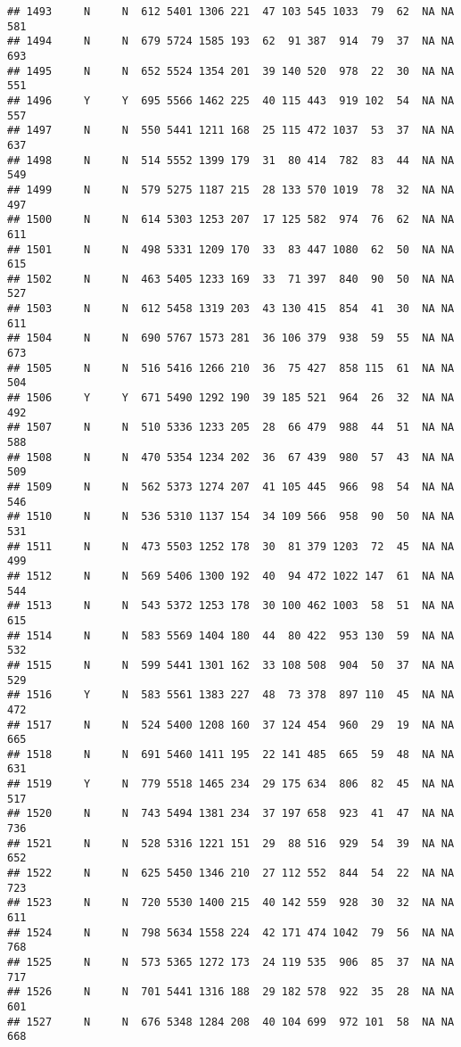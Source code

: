 \documentclass[]{article}
\begin{document}
\begin{verbatim}
## 1493     N     N  612 5401 1306 221  47 103 545 1033  79  62  NA NA  581
## 1494     N     N  679 5724 1585 193  62  91 387  914  79  37  NA NA  693
## 1495     N     N  652 5524 1354 201  39 140 520  978  22  30  NA NA  551
## 1496     Y     Y  695 5566 1462 225  40 115 443  919 102  54  NA NA  557
## 1497     N     N  550 5441 1211 168  25 115 472 1037  53  37  NA NA  637
## 1498     N     N  514 5552 1399 179  31  80 414  782  83  44  NA NA  549
## 1499     N     N  579 5275 1187 215  28 133 570 1019  78  32  NA NA  497
## 1500     N     N  614 5303 1253 207  17 125 582  974  76  62  NA NA  611
## 1501     N     N  498 5331 1209 170  33  83 447 1080  62  50  NA NA  615
## 1502     N     N  463 5405 1233 169  33  71 397  840  90  50  NA NA  527
## 1503     N     N  612 5458 1319 203  43 130 415  854  41  30  NA NA  611
## 1504     N     N  690 5767 1573 281  36 106 379  938  59  55  NA NA  673
## 1505     N     N  516 5416 1266 210  36  75 427  858 115  61  NA NA  504
## 1506     Y     Y  671 5490 1292 190  39 185 521  964  26  32  NA NA  492
## 1507     N     N  510 5336 1233 205  28  66 479  988  44  51  NA NA  588
## 1508     N     N  470 5354 1234 202  36  67 439  980  57  43  NA NA  509
## 1509     N     N  562 5373 1274 207  41 105 445  966  98  54  NA NA  546
## 1510     N     N  536 5310 1137 154  34 109 566  958  90  50  NA NA  531
## 1511     N     N  473 5503 1252 178  30  81 379 1203  72  45  NA NA  499
## 1512     N     N  569 5406 1300 192  40  94 472 1022 147  61  NA NA  544
## 1513     N     N  543 5372 1253 178  30 100 462 1003  58  51  NA NA  615
## 1514     N     N  583 5569 1404 180  44  80 422  953 130  59  NA NA  532
## 1515     N     N  599 5441 1301 162  33 108 508  904  50  37  NA NA  529
## 1516     Y     N  583 5561 1383 227  48  73 378  897 110  45  NA NA  472
## 1517     N     N  524 5400 1208 160  37 124 454  960  29  19  NA NA  665
## 1518     N     N  691 5460 1411 195  22 141 485  665  59  48  NA NA  631
## 1519     Y     N  779 5518 1465 234  29 175 634  806  82  45  NA NA  517
## 1520     N     N  743 5494 1381 234  37 197 658  923  41  47  NA NA  736
## 1521     N     N  528 5316 1221 151  29  88 516  929  54  39  NA NA  652
## 1522     N     N  625 5450 1346 210  27 112 552  844  54  22  NA NA  723
## 1523     N     N  720 5530 1400 215  40 142 559  928  30  32  NA NA  611
## 1524     N     N  798 5634 1558 224  42 171 474 1042  79  56  NA NA  768
## 1525     N     N  573 5365 1272 173  24 119 535  906  85  37  NA NA  717
## 1526     N     N  701 5441 1316 188  29 182 578  922  35  28  NA NA  601
## 1527     N     N  676 5348 1284 208  40 104 699  972 101  58  NA NA  668

\end{verbatim}
\end{document}
